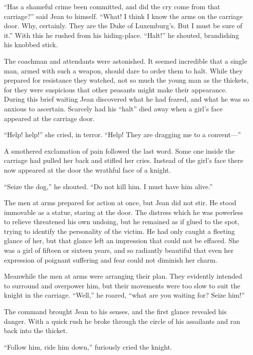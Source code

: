 ``Has a shameful crime been committed, and did the cry come from that
carriage?'' said Jean to himself. ``What! I think I know the arms on the
carriage door. Why, certainly. They are the Duke of Luxemburg's. But I
must be sure of it.'' With this he rushed from his hiding-place.
``Halt!'' he shouted, brandishing his knobbed stick.

The coachman and attendants were astonished. It seemed incredible that a
single man, armed with such a weapon, should dare to order them to halt.
While they prepared for resistance they watched, not so much the young
man as the thickets, for they were suspicious that other peasants might
make their appearance. During this brief waiting Jean discovered what he
had feared, and what he was so anxious to ascertain. Scarcely had his
``halt'' died away when a girl's face appeared at the carriage door.

``Help! help!'' she cried, in terror. ``Help! They are dragging me to a
convent---''

A smothered exclamation of pain followed the last word. Some one inside
the carriage had pulled her back and stifled her cries. Instead of the
girl's face there now appeared at the door the wrathful face of a
knight.

``Seize the dog,'' he shouted. ``Do not kill him. I must have him
alive.''

The men at arms prepared for action at once, but Jean did not stir. He
stood immovable as a statue, staring at the door. The distress which he
was powerless to relieve threatened his own undoing, but he remained as
if glued to the spot, trying to identify the personality of the victim.
He had only caught a fleeting glance of her, but that glance left an
impression that could not be effaced. She was a girl of fifteen or
sixteen years, and so radiantly beautiful that even her expression of
poignant suffering and fear could not diminish her charm.

Meanwhile the men at arms were arranging their plan. They evidently
intended to surround and overpower him, but their movements were too
slow to suit the knight in the carriage. ``Well,'' he roared, ``what are
you waiting for? Seize him!''

The command brought Jean to his senses, and the first glance revealed
his danger. With a quick rush he broke through the circle of his
assailants and ran back into the thicket.

``Follow him, ride him down,'' furiously cried the knight.

